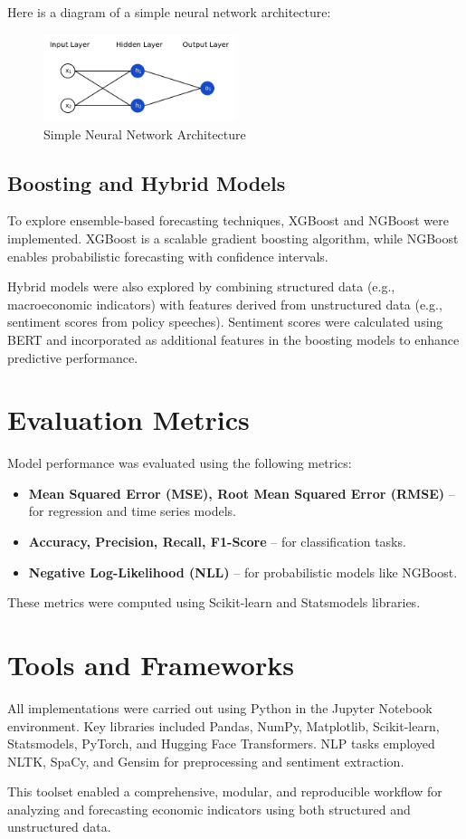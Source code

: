 Here is a diagram of a simple neural network architecture:
\begin{figure}[H]
  \centering
  \includegraphics[width=0.5\textwidth]{../images/network.png}
  \caption{Simple Neural Network Architecture}
  \label{fig:neural-network}
\end{figure}

\subsection{Boosting and Hybrid Models}
\label{sec:boosting-hybrid}
To explore ensemble-based forecasting techniques, XGBoost and NGBoost were implemented. XGBoost is a scalable gradient boosting algorithm, while NGBoost enables probabilistic forecasting with confidence intervals.

Hybrid models were also explored by combining structured data (e.g., macroeconomic indicators) with features derived from unstructured data (e.g., sentiment scores from policy speeches). Sentiment scores were calculated using BERT and incorporated as additional features in the boosting models to enhance predictive performance.

\section{Evaluation Metrics}
\label{sec:evaluation-metrics}
Model performance was evaluated using the following metrics:

\begin{itemize}
  \item \textbf{Mean Squared Error (MSE), Root Mean Squared Error (RMSE)} -- for regression and time series models.
  \item \textbf{Accuracy, Precision, Recall, F1-Score} -- for classification tasks.
  \item \textbf{Negative Log-Likelihood (NLL)} -- for probabilistic models like NGBoost.
\end{itemize}

These metrics were computed using Scikit-learn and Statsmodels libraries.

\section{Tools and Frameworks}
\label{sec:tools-frameworks}
All implementations were carried out using Python in the Jupyter Notebook environment. Key libraries included Pandas, NumPy, Matplotlib, Scikit-learn, Statsmodels, PyTorch, and Hugging Face Transformers. NLP tasks employed NLTK, SpaCy, and Gensim for preprocessing and sentiment extraction.

This toolset enabled a comprehensive, modular, and reproducible workflow for analyzing and forecasting economic indicators using both structured and unstructured data.
